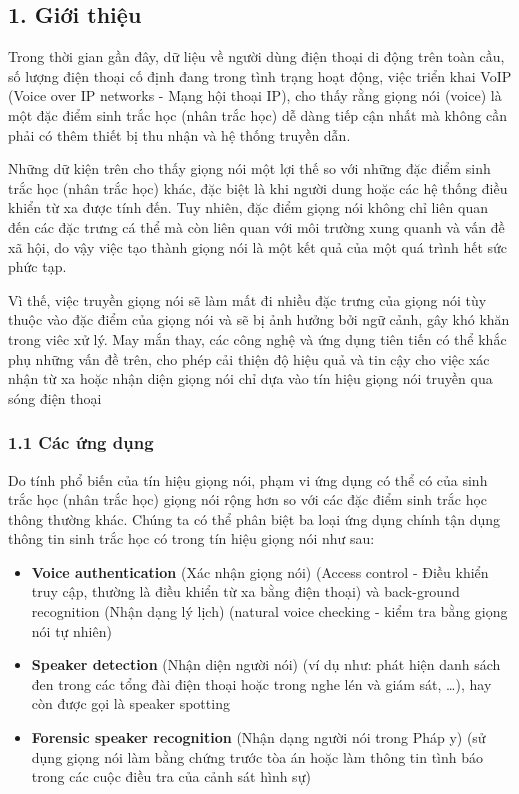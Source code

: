 \documentclass{article}
\begin{document}
	\subsection{1. Giới thiệu}
	\qquad\qquad Trong thời gian gần đây, dữ liệu về người dùng điện thoại di động trên toàn cầu, số lượng điện thoại cố định đang trong tình trạng hoạt động, việc triển khai VoIP (Voice over IP networks - Mạng hội thoại IP), cho thấy rằng giọng nói (voice) là một đặc điểm sinh trắc học (nhân trắc học) dễ dàng tiếp cận nhất mà không cần phải có thêm thiết bị thu nhận và hệ thống truyền dẫn.
	
	Những dữ kiện trên cho thấy giọng nói một lợi thế so với những đặc điểm sinh trắc học (nhân trắc học) khác, đặc biệt là khi người dung hoặc các hệ thống điều khiển từ xa được tính đến. Tuy nhiên, đặc điểm giọng nói không chỉ liên quan đến các đặc trưng cá thể mà còn liên quan với môi trường xung quanh và vấn đề xã hội, do vậy việc tạo thành giọng nói là một kết quả của một quá trình hết sức phức tạp.
	
	Vì thế, việc truyền giọng nói sẽ làm mất đi nhiều đặc trưng của giọng nói tùy thuộc vào đặc điểm của giọng nói và sẽ bị ảnh hưởng bởi ngữ cảnh, gây khó khăn trong viêc xử lý. May mắn thay, các công nghệ và ứng dụng tiên tiến có thể khắc phụ những vấn đề trên, cho phép cải thiện độ hiệu quả và tin cậy cho việc xác nhận từ xa hoặc nhận diện giọng nói chỉ dựa vào tín hiệu giọng nói truyền qua sóng điện thoại
	\subsubsection{1.1 Các ứng dụng}
	\qquad Do tính phổ biến của tín hiệu giọng nói, phạm vi ứng dụng có thể có của sinh trắc học (nhân trắc học) giọng nói rộng hơn so với các đặc điểm sinh trắc học thông thường khác. Chúng ta có thể phân biệt ba loại ứng dụng chính tận dụng thông tin sinh trắc học có trong tín hiệu giọng nói như sau:
	
	\begin{itemize}
		\item \textbf{Voice authentication} (Xác nhận giọng nói) (Access control - Điều khiển truy cập, thường là điều khiển từ xa bằng điện thoại) và back-ground recognition (Nhận dạng lý lịch) (natural voice checking - kiểm tra bằng giọng nói tự nhiên)
		\item \textbf{Speaker detection} (Nhận diện người nói) (ví dụ như: phát hiện danh sách đen trong các tổng đài điện thoại hoặc trong nghe lén và giám sát, …), hay còn được gọi là speaker spotting
		\item \textbf{Forensic speaker recognition} (Nhận dạng người nói trong Pháp y) (sử dụng giọng nói làm bằng chứng trước tòa án hoặc làm thông tin tình báo trong các cuộc điều tra của cảnh sát hình sự)
	\end{itemize}
\end{document}
